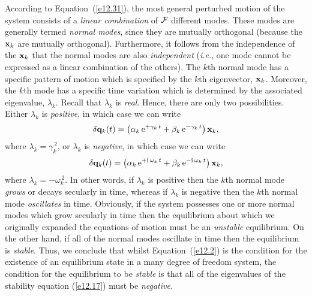 According to Equation~(\ref{e12.31}), the most general perturbed motion of the
system consists of a {\em linear combination}\/ of ${\cal F}$ different modes. These
modes are generally termed {\em normal modes}, since they are mutually
orthogonal (because the ${\bf x}_k$ are mutually orthogonal).  Furthermore, it follows
from the independence of the ${\bf x}_k$ that the normal
modes are also {\em independent}\/ ({\em i.e.}, one mode cannot be expressed as a
linear combination of the others). The $k$th normal mode has a specific
pattern of motion which is specified by the $k$th  eigenvector, ${\bf x}_k$. 
Moreover, the $k$th  mode has a specific time variation which is determined by the associated eigenvalue, $\lambda_k$. Recall that
$\lambda_k$ is {\em real}. Hence, there are only two possibilities. Either $\lambda_k$ is {\em positive}, in which case we can write
\begin{equation}
\delta {\bf q}_k(t) = \left(\alpha_k \,{\rm e}^{+\gamma_k\,t}+\beta_k\,{\rm e}^{-\gamma_k\,t}\right)
{\bf x}_k,
\end{equation}
where $\lambda_k = \gamma_k^{\,2}$, or 
$\lambda_k$ is {\em negative}, in which case we can write
\begin{equation}
\delta {\bf q}_k(t) = \left(\alpha_k \,{\rm e}^{+{\rm i}\,\omega_k\,t}+\beta_k\,{\rm e}^{-{\rm i}\,\omega_k\,t}\right)
{\bf x}_k,
\end{equation}
where $\lambda_k = -\omega_k^{\,2}$. In other words, if $\lambda_k$ is
positive then the $k$th normal mode {\em grows}\/ or decays secularly in time, whereas
if $\lambda_k$ is negative then the $k$th normal mode {\em oscillates}\/  in time.
Obviously, if the system possesses one or more normal modes which grow
secularly in time then the equilibrium about which we originally expanded the
equations of motion must be an {\em unstable}\/ equilibrium. On the
other hand, if all of the normal modes oscillate in time then the equilibrium is
{\em stable}. Thus, we conclude that whilst Equation~(\ref{e12.2})
is the condition for the existence of an equilibrium state in a many degree of freedom system, the condition for the
equilibrium to be {\em stable}\/ is that all of the eigenvalues of the stability
equation (\ref{e12.17}) must be {\em negative}.

